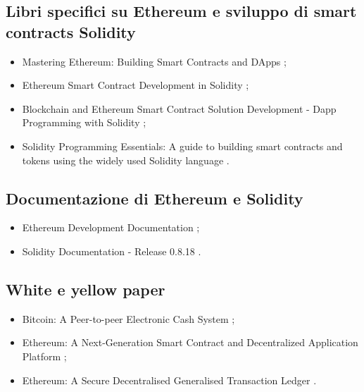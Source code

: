 \subsection*{Libri specifici su Ethereum e sviluppo di smart contracts Solidity}
\begin{itemize}

\item Mastering Ethereum: Building Smart Contracts and DApps \cite{antonopoulos2018ethereum};

\item Ethereum Smart Contract Development in Solidity \cite{zheng2020solidity};

\item Blockchain and Ethereum Smart Contract Solution Development - Dapp Programming with Solidity \cite{zhang2022solidity};

\item Solidity Programming Essentials: A guide to building smart contracts and tokens using the widely used Solidity language \cite{modi2022solidity}.

\end{itemize}

\subsection*{Documentazione di Ethereum e Solidity}
\begin{itemize}

\item Ethereum Development Documentation \cite{ethereum2024doc};

\item Solidity Documentation - Release 0.8.18 \cite{solidity0.8.18doc}.

\end{itemize}

\subsection*{White e yellow paper}
\begin{itemize}
	
\item Bitcoin: A Peer-to-peer Electronic Cash System \cite{nakamoto2008bitcoin};

\item Ethereum: A Next-Generation Smart Contract and Decentralized Application Platform \cite{buterin2014ethereumwhite};

\item Ethereum: A Secure Decentralised Generalised Transaction Ledger \cite{wood2024ethereumyellow}.

\end{itemize}

